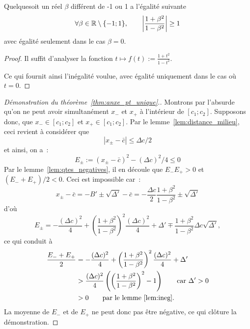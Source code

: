 \documentclass[main.tex]{subfiles}
\begin{document}
\begin{lemme}
\label{lem:ineg} Quelquesoit un réel $\beta$ différent de -1 ou 1 a l'égalité suivante 
\begin{equation}
\forall \beta \in \mathbb{R} \setminus \{ -1; 1 \}, \qquad  \left| \frac{1+\beta^2}{1-\beta^2} \right| \geq 1
\end{equation}
avec égalité seulement dans le cas $\beta=0$.
\end{lemme}
\begin{proof}
Il suffit d'analyser la fonction $t \mapsto f(t):= \frac{1+t^2}{1-t^2}$. 
\begin{center}
\end{center}
Ce qui fournit ainsi l'inégalité voulue, avec égalité uniquement dans le cas où~\mbox{$t=0$}.
\end{proof}

\begin{proof}[Démonstration du théorème~\ref{thm:anxe_pt_unique}.] Montrons par l'absurde qu'on ne peut avoir simultanément $x_-$ et $x_+$ à l'intérieur de $[c_1;c_2]$.
Supposons donc, que  $x_-\in[c_1;c_2]$ et $x_+\in[c_1;c_2]$. Par le lemme~\ref{lem:distance_milieu}, ceci revient à considérer que
$$| x_\pm-\bar{c} | \leq \Delta c / 2 $$
et ainsi, on a~:
$$ E_\pm := (x_\pm - \bar{c})^2 - (\Delta c)^2/4 \leq 0 $$
Par le lemme~\ref{lem:qtes_negatives}, il en découle que $E_-E_+ >0$ et $(E_-+E_+)/2 <0$. Ceci est impossible car~:
$$ x_\pm -\bar{c} = -B' \pm \sqrt{\Delta'} - \bar{c} =  -\frac{\Delta c}{2} \frac{1+\beta^2}{1-\beta^2} \pm \sqrt{\Delta'} $$
d'où
$$ E_\pm = - \frac{(\Delta c)^2}{4} + \left( \frac{1+\beta^2}{1-\beta^2} \right)^2 \frac{(\Delta c)^2}{4} +\Delta' \mp  \frac{1+\beta^2}{1-\beta^2} \Delta c \sqrt{\Delta'},  $$
ce qui conduit à
\begin{align*}
\frac{ E_-+E_+}{2} & = - \frac{(\Delta c)^2}{4} + \left( \frac{1+\beta^2}{1-\beta^2} \right)^2 \frac{(\Delta c)^2}{4} +\Delta' \\
& > \frac{(\Delta c)^2}{4} \left( \left( \frac{1+\beta^2}{1-\beta^2} \right)^2 - 1 \right) \qquad \textrm{car}\ \Delta' > 0 \\
&> 0  \qquad \textrm{par le lemme~\ref{lem:ineg}}.
\end{align*}
La moyenne de $E_-$ et de $E_+$ ne peut donc pas être négative, ce qui clôture la démonstration.
\end{proof}
\end{document}
